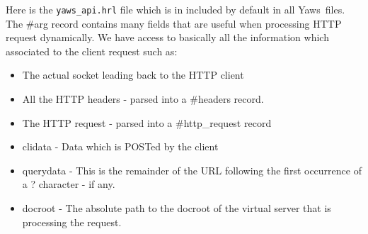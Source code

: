 \documentclass[11pt,oneside,english]{book}
\newcommand{\Yaws}            %
        {{\sc Yaws}}
\begin{document}
Here is the \verb+yaws_api.hrl+ file which is in included by default
in all \Yaws\ files. The \#arg{} record contains many fields that are
useful when processing HTTP request dynamically.
We have access to basically all the information which associated to the
client request such as:
\begin{itemize}

\item The actual socket leading back to the HTTP client
\item All the HTTP headers - parsed into a \#headers record.
\item The HTTP request - parsed into a \#http\_request record
\item clidata - Data which is POSTed by the client
\item querydata - This is the remainder of the URL following the first
occurrence of a ? character - if any.
\item docroot - The absolute path to the docroot of the virtual server
that is processing the request.
\end{itemize}
\end{document}
